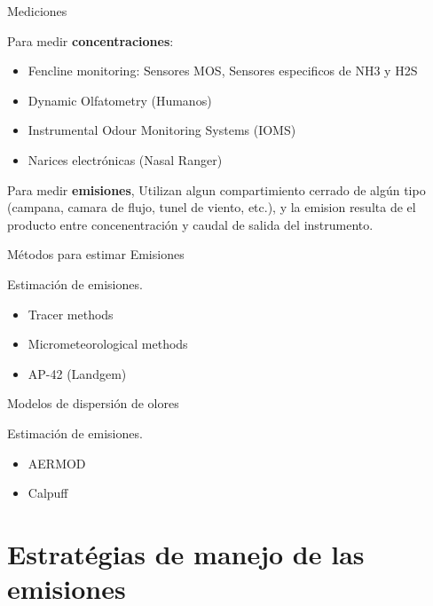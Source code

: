 \begin{frame}{Mediciones}

Para medir \textbf{concentraciones}:
\begin{itemize}
    \item Fencline monitoring: Sensores MOS, Sensores especificos de NH3 y H2S
    \item Dynamic Olfatometry  (Humanos)
    \item Instrumental Odour Monitoring Systems (IOMS)
    \item Narices electrónicas  (Nasal Ranger)   
\end{itemize}    

Para medir \textbf{emisiones}, Utilizan algun compartimiento cerrado de algún tipo (campana, camara de flujo, tunel de viento, etc.), y la emision resulta de el producto entre concenentración y caudal de salida del instrumento.


\end{frame}    


\begin{frame}{Métodos para estimar Emisiones}

Estimación de emisiones.
\begin{itemize}
    \item Tracer methods
    \item Micrometeorological methods
    \item AP-42 (Landgem)
\end{itemize}    
\end{frame}    


\begin{frame}{Modelos de dispersión de olores}

Estimación de emisiones.
\begin{itemize}
    \item AERMOD
    \item Calpuff
\end{itemize}    
\end{frame}    


\section{Estratégias de manejo de las emisiones}


